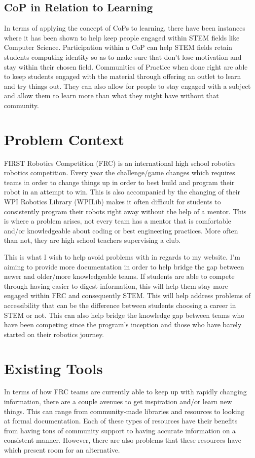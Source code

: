 \documentclass[10pt,twocolumn]{article}
\begin{document}
\subsection{CoP in Relation to Learning}

In terms of applying the concept of CoPs to learning, there have been instances where it has been shown to help keep people engaged within STEM fields like Computer Science. Participation within a CoP can help STEM fields retain students computing identity so as to make sure that don't lose motivation and stay within their chosen field\cite{kargarmoakhar_impact_2024}. Communities of Practice when done right are able to keep students engaged with the material through offering an outlet to learn and try things out. They can also allow for people to stay engaged with a subject and allow them to learn more than what they might have without that community.


\section{Problem Context}
FIRST Robotics Competition (FRC) is an international high school robotics robotics competition. Every year the challenge/game changes which requires teams in order to change things up in order to best build and program their robot in an attempt to win. This is also accompanied by the changing of their WPI Robotics Library (WPILib) makes it often difficult for students to consistently program their robots right away without the help of a mentor. This is where a problem arises, not every team has a mentor that is comfortable and/or knowledgeable about coding or best engineering practices. More often than not, they are high school teachers supervising a club. 

This is what I wish to help avoid problems with in regards to my website. I'm aiming to provide more documentation in order to help bridge the gap between newer and older/more knowledgeable teams. If students are able to compete through having easier to digest information, this will help them stay more engaged within FRC and consequently STEM. This will help address problems of accessibility that can be the difference between students choosing a career in STEM or not.  This can also help bridge the knowledge gap between teams who have been competing since the program's inception and those who have barely started on their robotics journey.



\section{Existing Tools}
In terms of how FRC teams are currently able to keep up with rapidly changing information, there are a couple avenues to get inspiration and/or learn new things. This can range from community-made libraries and resources to looking at formal documentation. Each of these types of resources have their benefits from having tons of community support to having accurate information on a consistent manner. However, there are also problems that these resources have which present room for an alternative.
\end{document}
